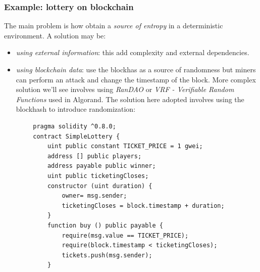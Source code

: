 \documentclass[10pt,a4paper]{report}
\begin{document}
	\subsubsection{Example: lottery on blockchain}\label{sec:example-lottery-on-blockchain}
	The main problem is how obtain a \textit{source of entropy} in a deterministic environment. A solution may be:
	\begin{itemize}
		\item 
		\textit{using external information}: this add complexity and external dependencies.
		\item 
		\textit{using blockchain data}: use the blockhas as a source of randomness but miners can perform an attack and change the timestamp of the block.
		More complex solution we'll see involves using \textit{RanDAO} or \textit{VRF - Verifiable Random Functions} used in Algorand.
		The solution here adopted involves using the blockhash to introduce randomization:
	\end{itemize}
	\begin{lstlisting}
		pragma solidity ^0.8.0; 
		contract SimpleLottery { 
			uint public constant TICKET_PRICE = 1 gwei; 
			address [] public players; 
			address payable public winner; 
			uint public ticketingCloses;
			constructor (uint duration) {
				owner= msg.sender; 
				ticketingCloses = block.timestamp + duration;
			} 
			function buy () public payable {
				require(msg.value == TICKET_PRICE); 
				require(block.timestamp < ticketingCloses); 
				tickets.push(msg.sender); 
			}
			
		\end{lstlisting}
		
\end{document}
